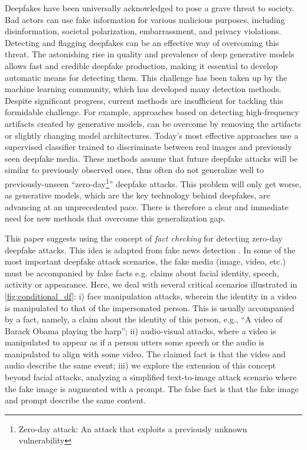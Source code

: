 \documentclass{article} \usepackage{iclr2024_conference,times}
\begin{document}
Deepfakes have been universally acknowledged to pose a grave threat to society. Bad actors can use fake information for various malicious purposes, including disinformation, societal polarization, embarrassment, and privacy violations. Detecting and flagging deepfakes can be an effective way of overcoming this threat. The astonishing rise in quality and prevalence of deep generative models allows fast and credible deepfake production, making it essential to develop automatic means for detecting them. This challenge has been taken up by the machine learning community, which has developed many detection methods. Despite significant progress, current methods are insufficient for tackling this formidable challenge. For example, approaches based on detecting high-frequency artifacts created by generative models, can be overcome by removing the artifacts or slightly changing model architectures. Today's most effective approaches use a supervised classifier trained to discriminate between real images and previously seen deepfake media. These methods assume that future deepfake attacks will be similar to previously observed ones, thus often do not generalize well to previously-unseen “zero-day\footnote{Zero-day attack: An attack that exploits a previously unknown vulnerability}” deepfake attacks. This problem will only get worse, as generative models, which are the key technology behind deepfakes, are advancing at an unprecedented pace. There is therefore a clear and immediate need for new methods that overcome this generalization gap.

This paper suggests using the concept of \textit{fact checking} for detecting zero-day deepfake attacks. This idea is adapted from fake news detection \citep{fake_news_1,fake_news_2,fake_news_3}. In some of the most important deepfake attack scenarios, the fake media (image, video, etc.) must be accompanied by false facts e.g. claims about facial identity, speech, activity or appearance. Here, we deal with several critical scenarios illustrated in \cref{fig:conditional_df}: i) face manipulation attacks, wherein the identity in a video is manipulated to that of the impersonated person. This is usually accompanied by a fact, namely, a claim about the identity of this person, e.g., “A video of Barack Obama playing the harp”; ii) audio-visual attacks, where a video is manipulated to appear as if a person utters some speech or the audio is manipulated to align with some video. The claimed fact is that the video and audio describe the same event; iii) we explore the extension of this concept beyond facial attacks, analyzing a simplified text-to-image attack scenario where the fake image is augmented with a prompt. The false fact is that the fake image and prompt describe the same content.
\end{document}
